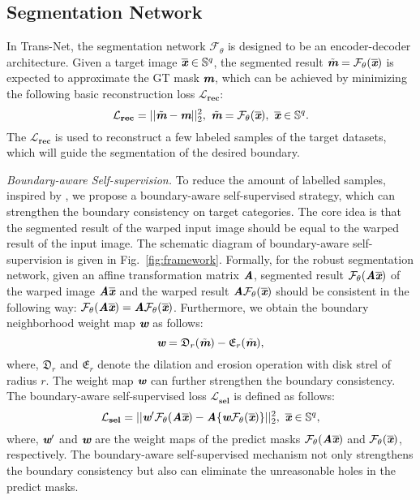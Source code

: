 \documentclass[letterpaper]{article} %
\begin{document}
\subsection{Segmentation Network}

In  Trans-Net, the segmentation network $\mathcal{F}_{\theta}$ is designed to be an encoder-decoder architecture. Given a target image $\overline{\textbf{\em x}}\in \mathbb{S}^q$, the segmented result $\tilde{\textbf{\em m}}=\mathcal{F}_{\theta}(\overline{\textbf{\em x}})$ is expected to approximate the GT mask $\textbf{\em m}$, which can be achieved by minimizing the following basic reconstruction loss $\mathbf{\mathcal{L}_{rec}}$:
\begin{equation}\label{eq1}
\mathbf{\mathcal{L}_{rec}}=||\tilde{\textbf{\em m}}-\textbf{\em m}||^2_2,~\tilde{\textbf{\em m}}=\mathcal{F}_{\theta}(\overline{\textbf{\em x}}),~\overline{\textbf{\em x}}\in \mathbb{S}^q.
\end{equation}
The $\mathbf{\mathcal{L}_{rec}}$ is used to reconstruct a few labeled samples of the target datasets, which will guide the segmentation of the desired boundary.

\emph{Boundary-aware Self-supervision.} To reduce the
amount of labelled samples,
inspired by \citet{wang2019self-supervised}, we propose a boundary-aware self-supervised strategy, which can strengthen the boundary consistency on target categories. The core idea is that the segmented result of the warped input image should be equal to the warped result of the input image. The schematic diagram of boundary-aware self-supervision is given in Fig.~\ref{fig:framework}. Formally, for the robust segmentation network, given an affine transformation matrix $\textbf{\em A}$, segmented result $\mathcal{F}_{\theta}(\textbf{\em A}\overline{\textbf{\em x}})$ of the warped image $\textbf{\em A}\overline{\textbf{\em x}}$ and the warped result  $\textbf{\em A}\mathcal{F}_{\theta}(\overline{\textbf{\em x}})$ should be consistent in the following way: $\mathcal{F}_{\theta}(\textbf{\em A}\overline{\textbf{\em x}})=\textbf{\em A}\mathcal{F}_{\theta}(\overline{\textbf{\em x}})$. Furthermore, we obtain the boundary neighborhood weight map $\textbf{\em w}$ as follows:
\begin{equation}\label{eq2}
\textbf{\em w}=\mathfrak{D}_r(\tilde{\textbf{\em m}})-\mathfrak{E}_r(\tilde{\textbf{\em m}}),
\end{equation}
where, $\mathfrak{D}_r$ and $\mathfrak{E}_r$ denote the dilation and erosion operation with disk strel of radius $r$. The weight map $\textbf{\em w}$ can further strengthen the boundary consistency. The boundary-aware self-supervised loss $\mathbf{\mathcal{L}_{sel}}$ is defined as follows:
\begin{equation}\label{eq3}
\mathbf{\mathcal{L}_{sel}}=||\textbf{\em w}'\mathcal{F}_{\theta}(\textbf{\em A}\overline{\textbf{\em x}})-\textbf{\em A}\{\textbf{\em w}\mathcal{F}_{\theta}(\overline{\textbf{\em x}})\}||^2_2,~\overline{\textbf{\em x}}\in \mathbb{S}^q,
\end{equation}
where, $\textbf{\em w}'$ and $\textbf{\em w}$ are the weight maps of the predict masks $\mathcal{F}_{\theta}(\textbf{\em A}\overline{\textbf{\em x}})$ and $\mathcal{F}_{\theta}(\overline{\textbf{\em x}})$, respectively. The boundary-aware self-supervised mechanism not only strengthens the boundary consistency but also can eliminate the unreasonable holes in the predict masks.
\end{document}
